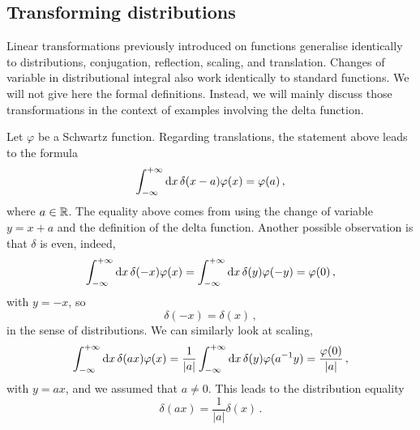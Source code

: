 \subsection{Transforming distributions}
Linear transformations previously introduced on functions generalise identically to
distributions, \ie conjugation, reflection, scaling, and translation. Changes of variable
in distributional integral also work identically to standard functions. We will not give
here the formal definitions. Instead, we will mainly discuss those transformations in the
context of examples involving the delta function.

Let $\varphi$ be a Schwartz function. Regarding translations, the statement above leads
to the formula
\begin{equation}
	\int_{-\infty}^{+\infty}\mathrm{d}{x}\,\delta(x-a)\varphi(x)=\varphi(a)\,,
\end{equation}
where $a\in\mathbb{R}$. The equality above comes from using the change of variable $y=x+a$ and the
definition of the delta function. Another possible observation is that $\delta$ is even,
indeed,
\begin{equation}
	\int_{-\infty}^{+\infty}\mathrm{d}{x}\,\delta(-x)\varphi(x)=\int_{-\infty}^{+\infty}\mathrm{d}{x}\,\delta(y)\varphi(-y)=\varphi(0)\,,
\end{equation}
with $y=-x$, so
\begin{equation}
	\delta(-x)=\delta(x)\,,
\end{equation}
in the sense of distributions. We can similarly look at scaling, \ie
\begin{equation}
	\int_{-\infty}^{+\infty}\mathrm{d}{x}\,\delta(ax)\varphi(x)=\frac{1}{|a|}\int_{-\infty}^{+\infty}\mathrm{d}{x}\,\delta(y)\varphi(a^{-1}y)
	=\frac{\varphi(0)}{|a|}\,,
\end{equation}
with $y=ax$, and we assumed that $a\neq 0$. This leads to the distribution equality
\begin{equation}
	\delta(ax)=\frac{1}{|a|}\delta(x)\,.
\end{equation}

